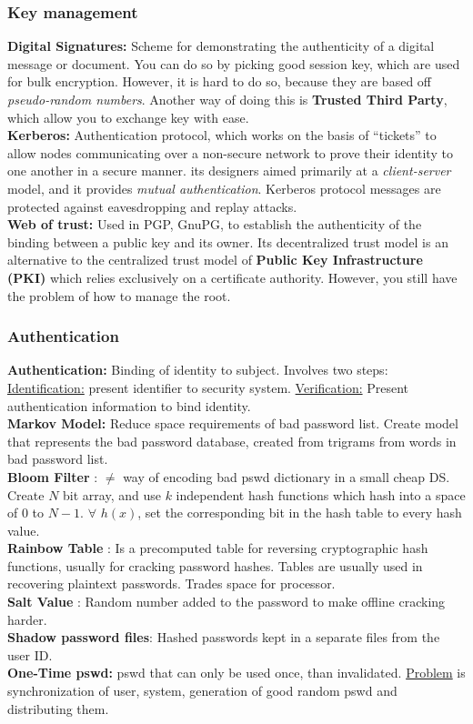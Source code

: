 \documentclass[a4paper,1pt]{article}
\begin{document}
\subsubsection{Key management} %
\label{sub:Key management}
{\bf Digital Signatures:} Scheme for demonstrating the authenticity of a digital message or document. You can do so by picking good session key, which are used for bulk encryption. However, it is hard to do so, because they are based off \emph{pseudo-random numbers}. Another way of doing this is {\bf Trusted Third Party}, which allow you to exchange key with ease. \\
  {\bf Kerberos:} Authentication protocol, which works on the basis of ``tickets'' to allow nodes communicating over a non-secure network to prove their identity to one another in a secure manner. its designers aimed primarily at a \emph{client-server} model, and it provides \emph{mutual authentication}. Kerberos protocol messages are protected against eavesdropping and replay attacks. \\
{\bf Web of trust:} Used in PGP, GnuPG, to establish the authenticity of the binding between a public key and its owner. Its decentralized trust model is an alternative to the centralized trust model of {\bf Public Key Infrastructure (PKI)} which relies exclusively on a certificate authority. However, you still have the problem of how to manage the root.
\subsubsection{Authentication} %
\label{sub:Authentication}
{\bf Authentication:} Binding of identity to subject. Involves two steps: \underline{Identification:} present identifier to security system. \underline{Verification:} Present authentication information to bind identity. \\
{\bf Markov Model:} Reduce space requirements of bad password list. Create model that represents the bad password database, created from trigrams from words in bad password list. \\
{\bf Bloom Filter} :
$\neq$ way of encoding bad pswd dictionary in a small cheap DS. Create $N$ bit array, and use $k$ independent hash functions which hash into a space of $0$ to $N-1$. $\forall$ $h(x)$, set the corresponding bit in the hash table to every hash value. \\
{\bf Rainbow Table} :
Is a precomputed table for reversing cryptographic hash functions, usually for cracking password hashes. Tables are usually used in recovering plaintext passwords. Trades space for processor.\\
{\bf Salt Value} :
Random number added to the password to make offline cracking harder.  \\
{\bf Shadow password files}:
Hashed passwords kept in a separate files from the user ID. \\
{\bf One-Time pswd:} pswd that can only be used once, than invalidated. \underline{Problem} is synchronization of user, system, generation of good random pswd and distributing them. \\
\end{document}
